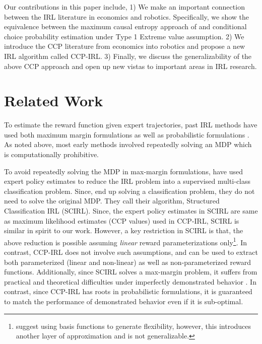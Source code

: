 \documentclass{article}
\begin{document}
Our contributions in this paper include, 1) We make an important connection between the IRL literature in economics and robotics. Specifically, we show the equivalence between the maximum causal entropy approach of \cite{ziebart2010modeling} and \cite{rust_gmc} conditional choice probability estimation under Type 1 Extreme value assumption. 2) We introduce the CCP literature from economics into robotics and propose a new IRL algorithm called CCP-IRL. 3) Finally, we discuss the generalizability of the above CCP approach and open up new vistas to important areas in IRL research.

\section{Related Work}

To estimate the reward function given expert trajectories, past IRL methods have used both maximum margin formulations \cite{abbeel2004apprenticeship, Ratliff2006} as well as probabilistic formulations \cite{ziebart}. As noted above, most early methods involved repeatedly solving an MDP which is computationally prohibitive.


To avoid repeatedly solving the MDP in max-margin formulations, \cite{klein2012inverse} have used expert policy estimates to reduce the IRL problem into a supervised multi-class classification problem. Since, \cite{klein2012inverse} end up solving a classification problem, they do not need to solve the original MDP. They call their algorithm, Structured Classification IRL (SCIRL). Since, the expert policy estimates in SCIRL are same as maximum likelihood estimates (CCP values) used in CCP-IRL, SCIRL is similar in spirit to our work. However, a key restriction in SCIRL is that, the above reduction is possible assuming \emph{linear} reward parameterizations only\footnote{\cite{klein2012inverse} suggest using basis functions to generate flexibility, however, this introduces another layer of approximation and is not generalizable.}. In contrast, CCP-IRL does not involve such assumptions, and can be used to extract both parameterized (linear and non-linear) as well as non-parameterized reward functions. Additionally, since SCIRL solves a max-margin problem, it suffers from practical and theoretical difficulties under imperfectly demonstrated behavior \cite{ziebart2010modeling}. In contrast, since CCP-IRL has roots in probabilistic formulations, it is guaranteed to match the performance of demonstrated behavior even if it is sub-optimal.
\end{document}

